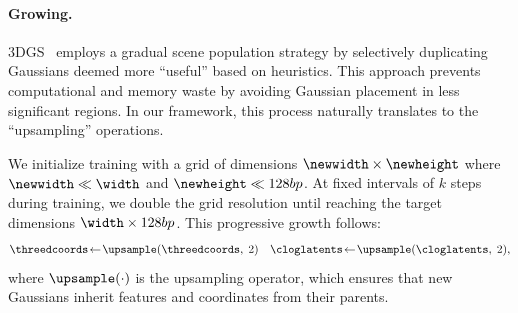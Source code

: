 
    \paragraph{Growing.}
      3DGS~\cite{kerbl20233d} employs a gradual scene population strategy by selectively duplicating Gaussians deemed more ``useful'' based on heuristics.
      This approach prevents computational and memory waste by avoiding Gaussian
      placement in less significant regions.
      In our framework, this process naturally translates to the ``upsampling''
      operations.

      We initialize training with a grid of dimensions $\newwidth \times \newheight$
      where $\newwidth \ll \width$ and $\newheight \ll \height$.
      At fixed intervals of $k$ steps during training, we double the grid resolution
      until reaching the target dimensions $\width \times \height$.
      This progressive growth follows:
      \begin{equation}
        \label{eq:clog-upsampling}
        \begin{aligned}
          \threedcoords\!\leftarrow\!\upsample(\threedcoords,\;2) \quad \cloglatents\!\leftarrow\!\upsample(\cloglatents,\; 2),
        \end{aligned}
      \end{equation}
      where $\upsample(\cdot)$ is the upsampling operator, which ensures that new Gaussians inherit features and coordinates from their parents.

